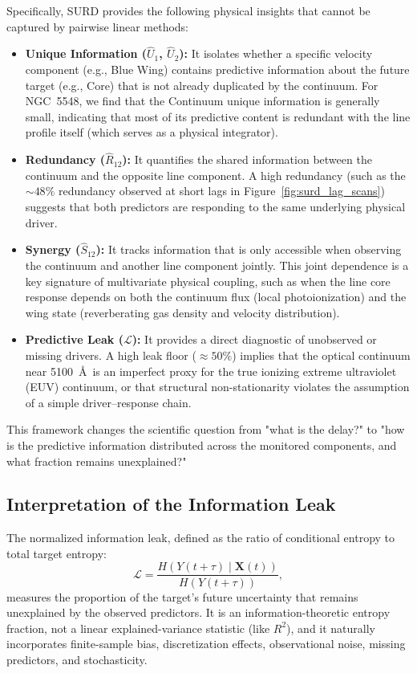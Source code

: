\documentclass[12pt, a4paper]{article}
\begin{document}
Specifically, SURD provides the following physical insights that cannot be captured by pairwise linear methods:
\begin{itemize}
    \item \textbf{Unique Information ($\widehat{U}_1$, $\widehat{U}_2$):} It isolates whether a specific velocity component (e.g., Blue Wing) contains predictive information about the future target (e.g., Core) that is not already duplicated by the continuum. For NGC~5548, we find that the Continuum unique information is generally small, indicating that most of its predictive content is redundant with the line profile itself (which serves as a physical integrator).
    \item \textbf{Redundancy ($\widehat{R}_{12}$):} It quantifies the shared information between the continuum and the opposite line component. A high redundancy (such as the $\sim 48\%$ redundancy observed at short lags in Figure~\ref{fig:surd_lag_scans}) suggests that both predictors are responding to the same underlying physical driver.
    \item \textbf{Synergy ($\widehat{S}_{12}$):} It tracks information that is only accessible when observing the continuum and another line component jointly. This joint dependence is a key signature of multivariate physical coupling, such as when the line core response depends on both the continuum flux (local photoionization) and the wing state (reverberating gas density and velocity distribution).
    \item \textbf{Predictive Leak ($\mathcal{L}$):} It provides a direct diagnostic of unobserved or missing drivers. A high leak floor ($\approx 50\%$) implies that the optical continuum near 5100~\AA\ is an imperfect proxy for the true ionizing extreme ultraviolet (EUV) continuum, or that structural non-stationarity violates the assumption of a simple driver--response chain.
\end{itemize}
This framework changes the scientific question from "what is the delay?" to "how is the predictive information distributed across the monitored components, and what fraction remains unexplained?"

\subsection{Interpretation of the Information Leak}

The normalized information leak, defined as the ratio of conditional entropy to total target entropy:
\begin{equation}
\mathcal{L} = \frac{H(Y(t+\tau) \mid \mathbf{X}(t))}{H(Y(t+\tau))},
\end{equation}
measures the proportion of the target's future uncertainty that remains unexplained by the observed predictors. It is an information-theoretic entropy fraction, not a linear explained-variance statistic (like $R^2$), and it naturally incorporates finite-sample bias, discretization effects, observational noise, missing predictors, and stochasticity.
\end{document}
